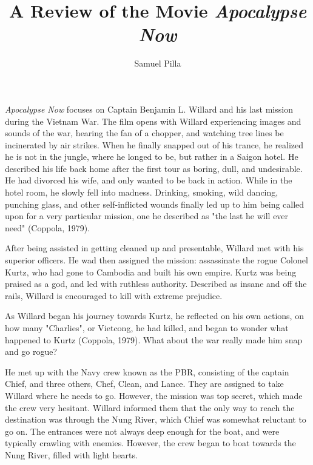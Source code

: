 \documentclass[a4paper,man,natbib]{apa6}
\title{A Review of the Movie \textit{Apocalypse Now}}
\author{Samuel Pilla}
\affiliation{Missouri University of Science and Technology}
\begin{document}
\maketitle

\textit{Apocalypse Now} focuses on Captain Benjamin L. Willard and his last mission during the Vietnam War. The film opens with Willard experiencing images and sounds of the war, hearing the fan of a chopper, and watching tree lines be incinerated by air strikes. When he finally snapped out of his trance, he realized he is not in the jungle, where he longed to be, but rather in a Saigon hotel. He described his life back home after the first tour as boring, dull, and undesirable. He had divorced his wife, and only wanted to be back in action. While in the hotel room, he slowly fell into madness. Drinking, smoking, wild dancing, punching glass, and other self-inflicted wounds finally led up to him being called upon for a very particular mission, one he described as "the last he will ever need" (Coppola, 1979).

After being assisted in getting cleaned up and presentable, Willard met with his superior officers. He wad then assigned the mission: assassinate the rogue Colonel Kurtz, who had gone to Cambodia and built his own empire. Kurtz was being praised as a god, and led with ruthless authority. Described as insane and off the rails, Willard is encouraged to kill with extreme prejudice.

As Willard began his journey towards Kurtz, he reflected on his own actions, on how many "Charlies", or Vietcong, he had killed, and began to wonder what happened to Kurtz (Coppola, 1979). What about the war really made him snap and go rogue?

He met up with the Navy crew known as the PBR, consisting of the captain Chief, and three others, Chef, Clean, and Lance. They are assigned to take Willard where he needs to go. However, the mission was top secret, which made the crew very hesitant. Willard informed them that the only way to reach the destination was through the Nung River, which Chief was somewhat reluctant to go on. The entrances were not always deep enough for the boat, and were typically crawling with enemies. However, the crew began to boat towards the Nung River, filled with light hearts.
\end{document}

